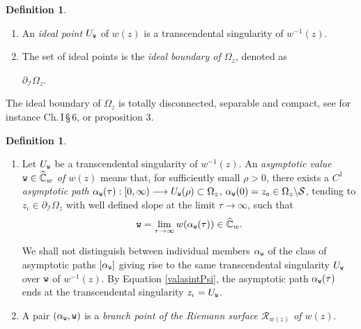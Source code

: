 \documentclass[final,3p,times]{elsarticle}
\newcommand{\CW}{\ensuremath{{\widehat{\mathbb C}}}}
\newcommand{\R}{\ensuremath{{\mathcal R}}}
\theoremstyle{definition}
\newtheorem{definition}[theorem]{Definition}
\begin{document}
\begin{definition}
\label{def:punto-ideal}
\
\begin{enumerate}[label=\arabic*),leftmargin=*] 
\item
An \emph{ideal point $U_{\tt w}$} of 
$w(z)$ is a transcendental singularity of 
$w^{-1}(z)$.


\item
The set of ideal points 
is the \emph{ideal boundary of $\Omega_z$},
denoted as 

\centerline{$\partial_{\mathcal{I}}\Omega_z$.}
\end{enumerate}
\end{definition}

The ideal boundary of $\Omega_z$ is totally disconnected, separable 
and compact, see for instance 
\cite{Ahlfors-Sario} Ch.\,I\,\S\,6, or
\cite{Richards} proposition 3.



\begin{definition}\label{defasymptoticvaluepath}
\
\begin{enumerate}[label=\arabic*),leftmargin=*] 
\item 
Let $U_{\tt w}$ be a transcendental singularity of $w^{-1}(z)$.
An \emph{asymptotic value ${\tt w}\in\CW_w$ of $w(z)$}
means that, 
for sufficiently small $\rho>0$,
there exists a $C^1$ 
\emph{asymptotic path}
$\alpha_{\tt w} ( \tau ): [0, \infty) \longrightarrow 
U_{\tt w}(\rho)\subset\Omega_z$,
$\alpha_{\tt w}(0)=z_{\tt o}  \in \Omega_z \backslash \mathcal{S}$,
tending to 
$ z_{\iota} \in \partial_{\mathcal{I}} \Omega_z$ with well defined slope
at the limit $\tau\to\infty$, such that  
\begin{equation}
\label{valasintPsi}
{\tt w} =
\lim_{
\tau  \to \infty
}
w ( \alpha_{\tt w} ( \tau ) )
\in\CW_w .
\end{equation}
\noindent 


\noindent 
We shall not distinguish between 
individual members $\alpha_{\tt w}$ of
the class of asymptotic
paths $[\alpha_{\tt w}]$ giving rise to the 
same transcendental singularity $U_{\tt w}$ over $\tt w$  
of $w^{-1}(z)$.
By Equation \eqref{valasintPsi}, the asymptotic path 
$\alpha_{\tt w} ( \tau )$
ends at the transcendental singularity $z_{\iota}=U_{\tt w}$.

\item
A pair $(\alpha_{\tt w}, {\tt w})$ is a 
\emph{branch point of 
the Riemann surface $\R_{w(z)}$ of $w(z)$}.
\end{enumerate}
\end{definition}
\end{document}
